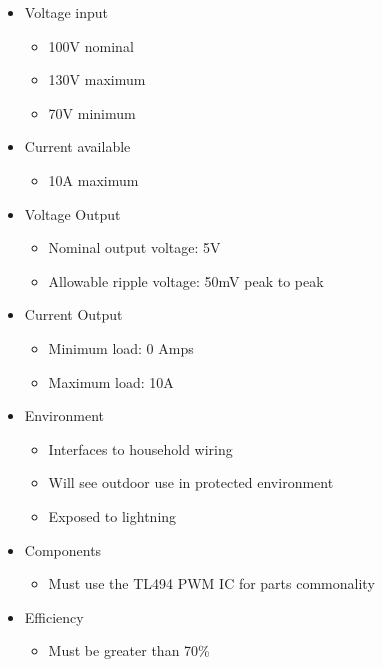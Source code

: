 \begin{itemize}
\item Voltage input

\begin{itemize}
\item 100V nominal
\item 130V maximum
\item 70V minimum
\end{itemize}


\item Current available

\begin{itemize}
\item 10A maximum
\end{itemize}


\item Voltage Output

\begin{itemize}
\item Nominal output voltage: 5V
\item Allowable ripple voltage: 50mV peak to peak
\end{itemize}


\item Current Output

\begin{itemize}
\item Minimum load: 0 Amps
\item Maximum load: 10A
\end{itemize}


\item Environment

\begin{itemize}
\item Interfaces to household wiring
\item Will see outdoor use in protected environment
\item Exposed to lightning
\end{itemize}


\item Components

\begin{itemize}
\item Must use the TL494 PWM IC for parts commonality
\end{itemize}


\item Efficiency

\begin{itemize}
\item Must be greater than 70\%
\end{itemize}
\end{itemize}

